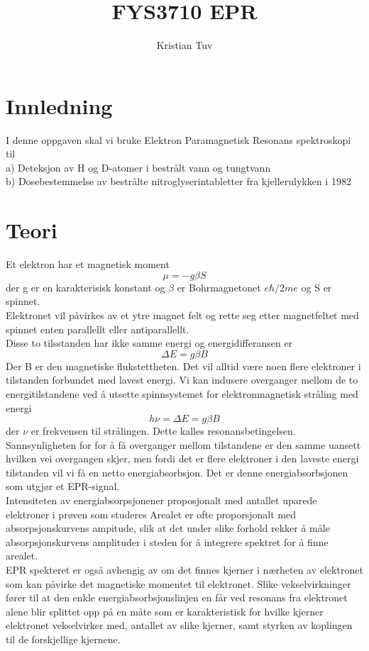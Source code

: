 \documentclass[a4paper, 12pt]{article}
\begin{document}
\author{Kristian Tuv}
\title{FYS3710  EPR}
\maketitle

\section{Innledning}
I denne oppgaven skal vi bruke Elektron Paramagnetisk Resonans spektroskopi til \\
a) Deteksjon av H og D-atomer i bestrålt vann og tungtvann\\
b) Dosebestemmelse av bestrålte nitroglyserintabletter fra kjellerulykken i 1982

\section{Teori}
Et elektron har et magnetisk moment
$$\mu = -g\beta S$$
der g er en karakterisisk konstant og $\beta $ er Bohrmagnetonet $e\hbar /2me$ og S er spinnet.\\
Elektronet vil påvirkes av et ytre magnet felt og rette seg etter magnetfeltet med spinnet enten parallellt eller antiparallellt.\\
Disse to tilsstanden har ikke samme energi og energidifferansen er
$$\Delta E = g\beta B$$
Der B er den magnetiske flukstettheten. Det vil alltid være noen flere elektroner i tilstanden forbundet med lavest energi.
Vi kan indusere overganger mellom de to energitilstandene ved å utsette spinnsystemet for elektronmagnetisk stråling med energi $$h \nu  = \Delta E = g\beta B$$
der $\nu$ er frekvensen til strålingen. Dette kalles resonansbetingelsen.\\
Sannsynligheten for for å få overganger mellom tilstandene er den samme uansett hvilken vei overgangen skjer, men fordi det er flere elektroner i den laveste energi tilstanden vil vi få en netto energiabsorbsjon. Det er denne energiabsorbsjonen som utgjør et  EPR-signal.\\
Intensiteten av energiabsorpsjonener proposjonalt med antallet uparede elektroner i prøven som studeres Arealet er ofte proporsjonalt med absorpsjonskurvens ampitude, slik at det under slike forhold rekker å måle absorpsjonskurvens amplituder i steden for å integrere spektret for å finne arealet.\\
EPR spekteret er også avhengig av om det finnes kjerner i nærheten av elektronet som kan påvirke det magnetiske momentet til elektronet. Slike vekselvirkninger fører til at den enkle energiabsorbsjonslinjen en får ved resonans fra elektronet alene blir splittet opp på en måte som er karakteristisk for hvilke kjerner elektronet vekselvirker med, antallet av slike kjerner, samt styrken av koplingen til de forskjellige kjernene.
\end{document}
